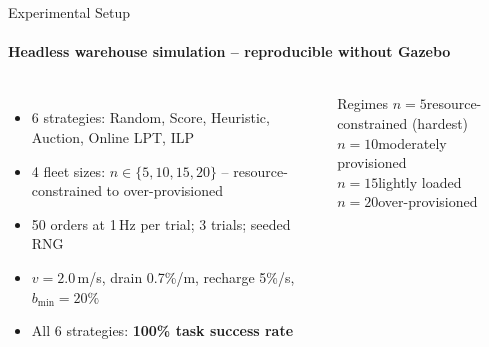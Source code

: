 \documentclass[aspectratio=169]{beamer}
\begin{document}
\begin{frame}{Experimental Setup}
  \framesubtitle{Headless warehouse simulation -- reproducible without Gazebo}
  \begin{columns}
      \begin{itemize}
        \item 6 strategies: Random, Score, Heuristic, Auction, Online LPT, \alert{ILP}
        \item 4 fleet sizes: $n \in \{5, 10, 15, 20\}$ -- resource-constrained to over-provisioned
        \item 50 orders at 1\,Hz per trial; 3 trials; seeded RNG
        \item $v=2.0$\,m/s, drain 0.7\%/m, recharge 5\%/s, $b_{\min}=20\%$
        \item All 6 strategies: \textbf{100\% task success rate}
      \end{itemize}
      \begin{block}{Regimes}
        \small
        $n=5$\quad resource-constrained (hardest)\\[3pt]
        $n=10$\quad moderately provisioned\\[3pt]
        $n=15$\quad lightly loaded\\[3pt]
        $n=20$\quad over-provisioned
      \end{block}
  \end{columns}
\end{frame}
\end{document}
